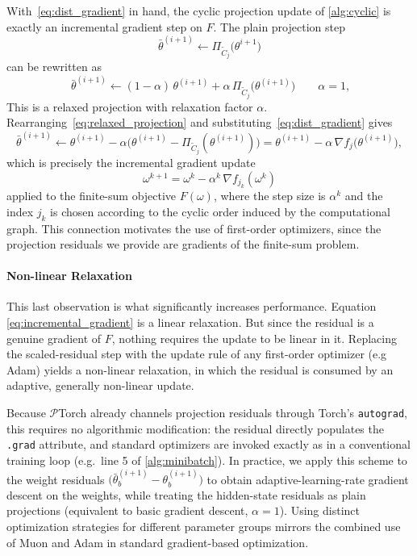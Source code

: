 With~\eqref{eq:dist_gradient} in hand, the cyclic projection update of \cref{alg:cyclic} is exactly an incremental gradient step on $F$. The plain projection step
\begin{equation}
    \bar \theta^{(i+1)} \gets \Pi_{\tilde{C}_j}\!\bigl(\theta^{i+1}\bigr)
    \label{eq:plain_projection}
\end{equation}
can be rewritten as
\begin{equation} \
    \bar \theta^{(i+1)}\gets (1-\alpha)\,\theta^{(i+1)} + \alpha\, \Pi_{\tilde{C}_j}\!\bigl(\theta^{(i+1)}\bigr)
    \qquad \alpha = 1,
    \label{eq:relaxed_projection}
\end{equation}
This is a relaxed projection with relaxation factor $\alpha$. Rearranging~\eqref{eq:relaxed_projection} and substituting~\eqref{eq:dist_gradient} gives
\begin{equation}
    \bar \theta^{(i+1)} \gets \theta^{(i+1)} - \alpha\bigl(\theta^{(i+1)} - \Pi_{\tilde{C}_j}(\theta^{(i+1)})\bigr) = \theta^{(i+1)} - \alpha\,\nabla f_j\!\bigl(\theta^{(i+1)}\bigr),
    \label{eq:projection_as_gradient_step}
\end{equation}
which is precisely the incremental gradient update~\cite[Eq.~(2.78)]{bertsekas1997nonlinear}
\begin{equation}
    \omega^{k+1} = \omega^{k} - \alpha^{k}\,\nabla f_{j_k}(\omega^{k})
    \label{eq:incremental_gradient}
\end{equation}
applied to the finite-sum objective $F(\omega)$, where the step size is $\alpha^k$ and the index $j_k$ is chosen according to the cyclic order induced by the computational graph. This connection motivates the use of first-order optimizers, since the projection residuals we provide are gradients of the finite-sum problem.

\paragraph{Non-linear Relaxation}
\label{sec:relaxation}
This last observation is what significantly increases performance. Equation
\eqref{eq:incremental_gradient} is a linear relaxation. But since the residual is a genuine gradient of
$F$, nothing requires the update to be linear in it. Replacing the scaled-residual step with the update rule of any first-order optimizer (e.g Adam) yields a non-linear relaxation, in which the residual is consumed by an adaptive, generally non-linear update.

Because $\mathcal{P}$Torch already channels projection residuals through Torch's
\texttt{autograd}, this requires no algorithmic modification: the residual directly populates
the \texttt{.grad} attribute, and standard optimizers are invoked exactly as in a conventional
training loop (e.g.\ line 5 of \cref{alg:minibatch}). In practice, we apply this scheme to the
weight residuals $\bigl(\bar{\theta}^{(i+1)}_b - \theta^{(i+1)}_b\bigr)$ to obtain
adaptive-learning-rate gradient descent on the weights, while treating the hidden-state
residuals as plain projections (equivalent to basic gradient descent, $\alpha = 1$). Using
distinct optimization strategies for different parameter groups mirrors the combined use of
Muon and Adam \cite{jordan2024muon} in standard gradient-based optimization.


